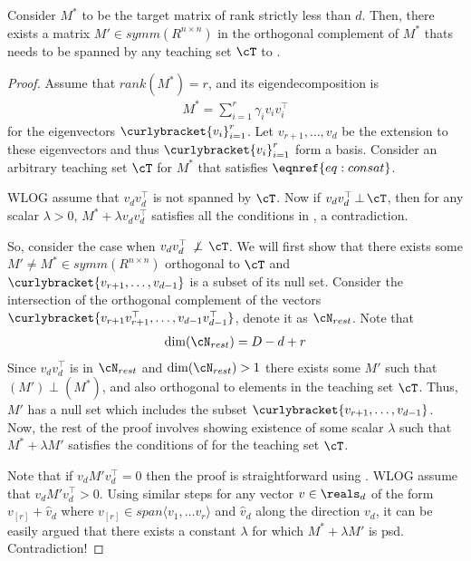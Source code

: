 \begin{lemma}\label{lem: uniquevec}
Consider $M^*$ to be the target matrix of rank strictly less than $d$. Then, there exists a matrix $M' \in symm(R^{n\times n})$ in the orthogonal complement of $M^*$ thats needs to be spanned by any teaching set $\cT$ to .
\end{lemma}
\begin{proof}
    Assume that $rank(M^*) = r$, and its eigendecomposition is 
    \begin{align*}
        M^* = \sum_{i=1}^r \gamma_i v_iv_i^{\top}
    \end{align*}
    for the eigenvectors $\curlybracket{v_i}_{i=1}^r$. Let $v_{r+1},\ldots,v_d$ be the extension to these eigenvectors and thus $\curlybracket{v_i}_{i=1}^r$ form a basis. Consider an arbitrary teaching set $\cT$ for $M^*$ that satisfies $\eqnref{eq: consat}$.
    
    WLOG assume that $v_dv_d^{\top}$ is not spanned by $\cT$. Now if $v_dv_d^{\top}\, \bot\, \cT$, then for any scalar $\lambda > 0$, $M^* + \lambda v_dv_d^{\top}$ satisfies all the conditions in , a contradiction. 
    
    So, consider the case when $v_dv_d^{\top}\, \not\perp\, \cT$. We will first show that there exists some $M' \neq M^* \in symm(R^{n\times n})$ orthogonal to $\cT$ and $\curlybracket{v_{r+1},\ldots,v_{d-1}}$ is a subset of its null set. Consider the intersection of the orthogonal complement of the vectors $\curlybracket{v_{r+1}v_{r+1}^{\top},\ldots,v_{d-1}v_{d-1}^{\top}}$, denote it as $\cN_{rest}$. Note that
    \begin{align}
        \dim(\cN_{rest}) = D - d + r
    \end{align}
    Since $v_dv_d^{\top}$ is in $\cN_{rest}$ and $\dim(\cN_{rest}) > 1$ there exists some $M'$ such that $(M') \perp (M^*)$, and also orthogonal to elements in the teaching set $\cT$. Thus, $M'$ has a null set which includes the subset $\curlybracket{v_{r+1},\ldots,v_{d-1}}$. Now, the rest of the proof involves showing existence of some scalar $\lambda$ such that $M^* + \lambda M'$ satisfies the conditions of  for the teaching set $\cT$. 

    Note that if $v_dM'v_d^{\top} = 0$ then the proof is straightforward using . WLOG assume that $v_dM'v_d^{\top} > 0$.  Using similar steps for any vector $v \in \reals_d$ of the form $v_{[r]} + \hat{v}_d$ where $v_{[r]} \in span\langle v_1,\ldots v_r\rangle$ and $\hat{v}_d$ along the direction $v_d$, it can be easily argued that there exists a constant $\lambda$ for which $M^* + \lambda M'$ is psd. Contradiction!
    
\end{proof}


